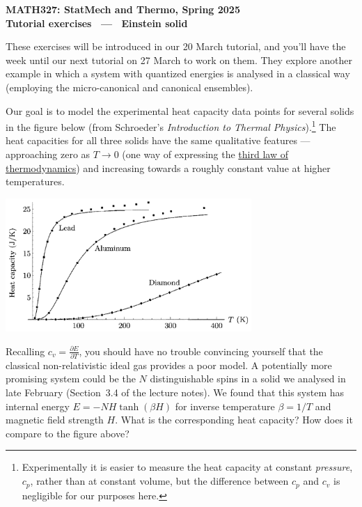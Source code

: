 \documentclass[12 pt]{article} %
\newcommand{\be}{\ensuremath{\beta} }
\newcommand{\pderiv}[2]{\ensuremath{\frac{\partial #1}{\partial #2}} }
\begin{document}
\newcommand{\thisunit}{MATH327 Tutorial (Solid)}
\newcommand{\moddate}{Last modified 20 Mar.~2025}
\begin{center}
  {\Large \textbf{MATH327: StatMech and Thermo, Spring 2025}} \\[12 pt]
  {\Large \textbf{Tutorial exercises \ --- \ Einstein solid}} \\[24 pt]
\end{center}

These exercises will be introduced in our 20 March tutorial, and you'll have the week until our next tutorial on 27 March to work on them.
They explore another example in which a system with quantized energies is analysed in a classical way (employing the micro-canonical and canonical ensembles).

Our goal is to model the experimental heat capacity data points for several solids in the figure below (from Schroeder's \textit{Introduction to Thermal Physics}).\footnote{Experimentally it is easier to measure the heat capacity at constant \textit{pressure}, $c_p$, rather than at constant volume, but the difference between $c_p$ and $c_v$ is negligible for our purposes here.}
The heat capacities for all three solids have the same qualitative features --- approaching zero as $T \to 0$ (one way of expressing the \href{https://en.wikipedia.org/wiki/Third_law_of_thermodynamics#Specific_heat}{third law of thermodynamics}) and increasing towards a roughly constant value at higher temperatures. \\[-24 pt]
\begin{center}\includegraphics[width=0.7\textwidth]{figs/heat_cap.pdf}\end{center}

Recalling $c_v = \pderiv{E}{T}$, you should have no trouble convincing yourself that the classical non-relativistic ideal gas provides a poor model.
A potentially more promising system could be the $N$ distinguishable spins in a solid we analysed in late February (Section~3.4 of the lecture notes).
We found that this system has internal energy $E = -NH\tanh(\be H)$ for inverse temperature $\be = 1 / T$ and magnetic field strength $H$.
What is the corresponding heat capacity?
How does it compare to the figure above?
\end{document}
